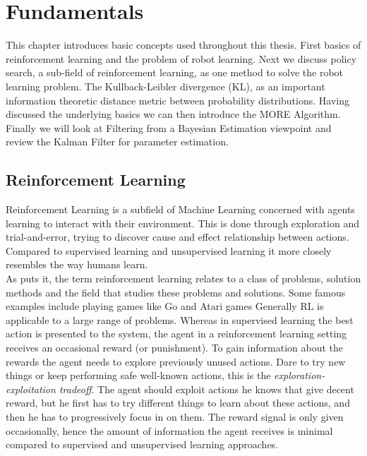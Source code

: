 
\chapter{Fundamentals}
This chapter introduces basic concepts used throughout this thesis.
First basics of reinforcement learning and the problem of robot learning.
Next we discuss policy search, a sub-field of reinforcement learning,
as one method to solve the robot learning problem.
The Kullback-Leibler divergence (KL), as an important information theoretic
distance metric between probability distributions.
Having discussed the underlying basics we can then
introduce the MORE Algorithm.
Finally we will look at Filtering from a Bayesian Estimation viewpoint and
review the Kalman Filter for parameter estimation.

\section{Reinforcement Learning}
Reinforcement Learning is a subfield of Machine Learning concerned with agents
learning to interact with their environment.
This is done through exploration and trial-and-error, trying to discover
cause and effect relationship between actions.
Compared to supervised learning and unsupervised learning it
more closely resembles the way humans learn. \\
As \citet{sutton2018reinforcement} puts it,
the term reinforcement learning relates to a class of problems,
solution methods and the field that studies these problems and solutions.
Some famous examples include playing games like Go
\citet{silver2016mastering} and Atari games \citet{mnih2013playing}
Generally RL is applicable to a large range of problems.
Whereas in supervised learning the best action is presented to the system,
the agent in a reinforcement learning setting receives an occasional
reward (or punishment).
To gain information about the rewards the agent needs
to explore previously unused actions.
Dare to try new things or keep performing safe
well-known actions, this is the \textit{exploration-exploitation tradeoff}.
The agent should exploit actions he knows that
give decent reward, but he first
has to try different things to learn about these actions,
and then he has to progressively focus in on them.
The reward signal is only given occasionally, hence the amount of information
the agent receives is minimal compared to
supervised and unsupervised learning approaches.

